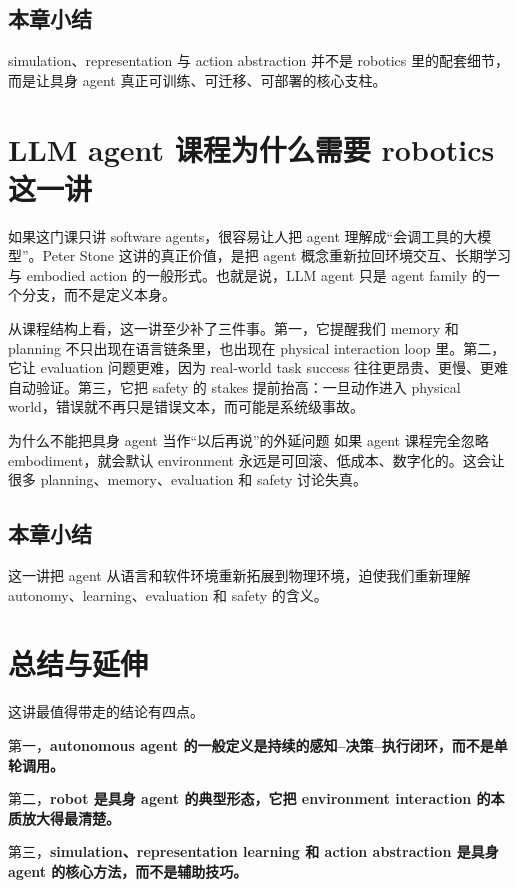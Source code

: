 \documentclass[a4paper]{article}
\begin{document}
\subsection{本章小结}
simulation、representation 与 action abstraction 并不是 robotics 里的配套细节，而是让具身 agent 真正可训练、可迁移、可部署的核心支柱。

\section{LLM agent 课程为什么需要 robotics 这一讲}
如果这门课只讲 software agents，很容易让人把 agent 理解成“会调工具的大模型”。Peter Stone 这讲的真正价值，是把 agent 概念重新拉回环境交互、长期学习与 embodied action 的一般形式。也就是说，LLM agent 只是 agent family 的一个分支，而不是定义本身。

从课程结构上看，这一讲至少补了三件事。第一，它提醒我们 memory 和 planning 不只出现在语言链条里，也出现在 physical interaction loop 里。第二，它让 evaluation 问题更难，因为 real-world task success 往往更昂贵、更慢、更难自动验证。第三，它把 safety 的 stakes 提前抬高：一旦动作进入 physical world，错误就不再只是错误文本，而可能是系统级事故。

\begin{warningbox}{为什么不能把具身 agent 当作“以后再说”的外延问题}
如果 agent 课程完全忽略 embodiment，就会默认 environment 永远是可回滚、低成本、数字化的。这会让很多 planning、memory、evaluation 和 safety 讨论失真。
\end{warningbox}

\subsection{本章小结}
这一讲把 agent 从语言和软件环境重新拓展到物理环境，迫使我们重新理解 autonomy、learning、evaluation 和 safety 的含义。

\section{总结与延伸}
这讲最值得带走的结论有四点。

第一，\textbf{autonomous agent 的一般定义是持续的感知--决策--执行闭环，而不是单轮调用。}

第二，\textbf{robot 是具身 agent 的典型形态，它把 environment interaction 的本质放大得最清楚。}

第三，\textbf{simulation、representation learning 和 action abstraction 是具身 agent 的核心方法，而不是辅助技巧。}
\end{document}
